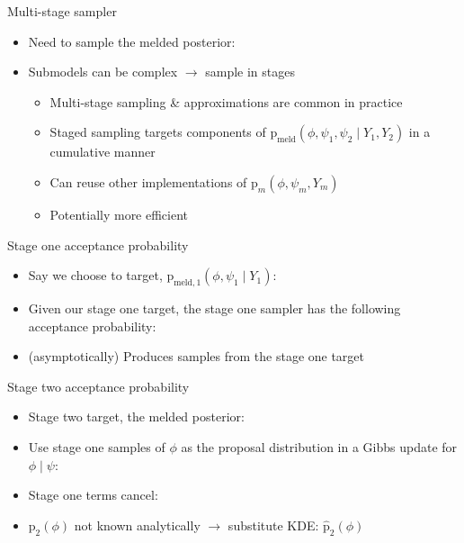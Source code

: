 \documentclass[10pt,ignorenonframetext,]{beamer}
\providecommand{\tightlist}{%
  \setlength{\itemsep}{0pt}\setlength{\parskip}{0pt}}
\newcommand{\pd}{\text{p}}
\newcommand{\modelindex}{m}
\begin{document}
\begin{frame}{Multi-stage sampler}

\begin{itemize}
\tightlist
\item
  Need to sample the melded posterior:
  
\item
  Submodels can be complex \(\rightarrow\) sample in stages

  \begin{itemize}
  \tightlist
  \item
    Multi-stage sampling \& approximations are common in practice
  \item
    Staged sampling targets components of
    \(\pd_{\text{meld}}(\phi, \psi_{1}, \psi_{2} \mid Y_{1}, Y_{2})\) in
    a cumulative manner
  \item
    Can reuse other implementations of
    \(\pd_{m}(\phi, \psi_{\modelindex}, Y_{\modelindex})\)
  \item
    Potentially more efficient
  \end{itemize}
\end{itemize}

\end{frame}

\begin{frame}{Stage one acceptance probability}

\begin{itemize}
\tightlist
\item
  Say we choose to target,
  \(\pd_{\text{meld}, 1}(\phi, \psi_{1} \mid Y_{1})\):
  
\item
  Given our stage one target, the stage one sampler has the following
  acceptance probability:
   
\item
  (asymptotically) Produces samples from the stage one target
\end{itemize}

\end{frame}

\begin{frame}{Stage two acceptance probability}

\begin{itemize}
\tightlist
\item
  Stage two target, the melded posterior:
  
\item
  Use stage one samples of \(\phi\) as the proposal distribution in a
  Gibbs update for \(\phi \mid \psi\):
  
\item
  Stage one terms cancel:
  
\item
  \(\pd_{2}(\phi)\) not known analytically \(\rightarrow\) substitute
  KDE: \(\hat{\pd}_{2}(\phi)\)
\end{itemize}

\end{frame}
\end{document}
